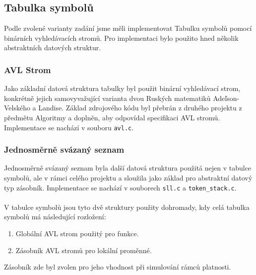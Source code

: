 \documentclass[a4paper]{article}
\theoremstyle{definition}
\begin{document}
\subsection{Tabulka symbolů}\label{sec_symtable}
Podle zvolené varianty zadání jsme měli implementovat Tabulku symbolů pomocí binárních vyhledávacích stromů.
Pro implementaci bylo použito hned několik abstraktních datových struktur.

\subsubsection{AVL Strom}
Jako základní datová struktura tabulky byl použit binární vyhledávací strom, konkrétně jejich samovyvažující varianta dvou Ruských matematiků Adeľson-Velského a Landise. Základ zdrojového kódu byl přebrán z druhého projektu z předmětu Algoritmy a doplněn, aby odpovídal specifikaci AVL stromů. Implementace se nachází v souboru \texttt{avl.c}.

\subsubsection{Jednosměrně svázaný seznam}
Jednosměrně svázaný seznam byla další datová struktura použitá nejen v tabulce symbolů, ale v rámci celého projektu
a sloužila jako základ pro abstraktní datový typ zásobník\label{tstack}. Implementace se nachází v souborech \texttt{sll.c} a \texttt{token\_stack.c}.
\\ \\
V tabulce symbolů jsou tyto dvě struktury použity dohromady, kdy celá tabulka symbolů má následující rozložení:
\begin{enumerate}
    \item Globální AVL strom použitý pro funkce.
    \item Zásobník AVL stromů pro lokální proměnné.
\end{enumerate}

Zásobník zde byl zvolen pro jeho vhodnost při simulování rámců platnosti.
\end{document}
